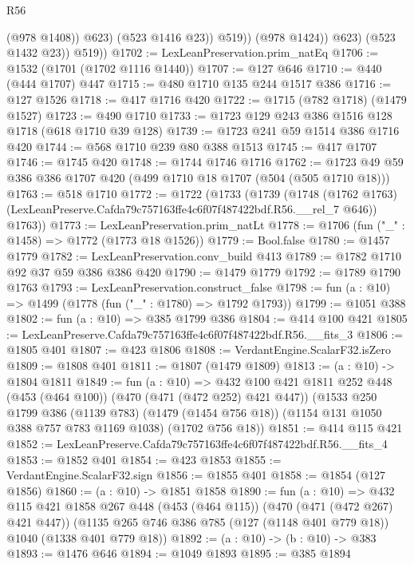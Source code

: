 \begin{lexlean}{R56}
\begin{coremodule}
                        (@978 @1408))
                      @623)
                    (@523 @1416 @23))
                  @519))
              (@978 @1424))
            @623)
          (@523 @1432 @23))
        @519))
@1702 := LexLeanPreservation.prim_natEq
@1706 := @1532 (@1701 (@1702 @1116 @1440))
@1707 := @127 @646
@1710 := @440 (@444 @1707) @447
@1715 := @480 @1710 @135 @244 @1517 @386
@1716 := @127 @1526
@1718 := @417 @1716 @420
@1722 := @1715 (@782 @1718) (@1479 @1527)
@1723 := @490 @1710
@1733 := @1723 @129 @243 @386 @1516 @128 @1718 (@618 @1710 @39 @128)
@1739 := @1723 @241 @59 @1514 @386 @1716 @420
@1744 := @568 @1710 @239 @80 @388 @1513
@1745 := @417 @1707
@1746 := @1745 @420
@1748 := @1744 @1746 @1716
@1762 := @1723 @49 @59 @386 @386 @1707 @420 (@499 @1710 @18 @1707 (@504 (@505 @1710 @18)))
@1763 := @518 @1710
@1772 := @1722
    (@1733
      (@1739
        (@1748 (@1762 @1763) (LexLeanPreserve.Cafda79c757163ffe4c6f07f487422bdf.R56.__rel_7 @646))
        @1763))
@1773 := LexLeanPreservation.prim_natLt
@1778 := @1706 (fun ("_" : @1458) => @1772 (@1773 @18 @1526))
@1779 := Bool.false
@1780 := @1457 @1779
@1782 := LexLeanPreservation.conv_build @413
@1789 := @1782 @1710 @92 @37 @59 @386 @386 @420
@1790 := @1479 @1779
@1792 := @1789 @1790 @1763
@1793 := LexLeanPreservation.construct_false
@1798 := fun (a : @10) => @1499 (@1778 (fun ("_" : @1780) => @1792 @1793))
@1799 := @1051 @388
@1802 := fun (a : @10) => @385 @1799 @386
@1804 := @414 @100 @421
@1805 := LexLeanPreserve.Cafda79c757163ffe4c6f07f487422bdf.R56.__fits_3
@1806 := @1805 @401
@1807 := @423 @1806
@1808 := VerdantEngine.ScalarF32.isZero
@1809 := @1808 @401
@1811 := @1807 (@1479 @1809)
@1813 := (a : @10) -> @1804 @1811
@1849 := fun (a : @10) =>
  @432
    @100
    @421
    @1811
    @252
    @448
    (@453 (@464 @100))
    (@470 (@471 (@472 @252) @421 @447))
    (@1533
      @250
      @1799
      @386
      (@1139 @783)
      (@1479 (@1454 @756 @18))
      (@1154 @131 @1050 @388 @757 @783 @1169 @1038)
      (@1702 @756 @18))
@1851 := @414 @115 @421
@1852 := LexLeanPreserve.Cafda79c757163ffe4c6f07f487422bdf.R56.__fits_4
@1853 := @1852 @401
@1854 := @423 @1853
@1855 := VerdantEngine.ScalarF32.sign
@1856 := @1855 @401
@1858 := @1854 (@127 @1856)
@1860 := (a : @10) -> @1851 @1858
@1890 := fun (a : @10) =>
  @432
    @115
    @421
    @1858
    @267
    @448
    (@453 (@464 @115))
    (@470 (@471 (@472 @267) @421 @447))
    (@1135 @265 @746 @386 @785 (@127 (@1148 @401 @779 @18)) @1040 (@1338 @401 @779 @18))
@1892 := (a : @10) -> (b : @10) -> @383
@1893 := @1476 @646
@1894 := @1049 @1893
@1895 := @385 @1894

\end{coremodule}
\end{lexlean}
